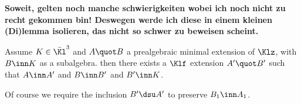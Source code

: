 

\medskip
{\bf Soweit, gelten noch manche schwierigkeiten wobei ich noch nicht zu recht gekommen bin!
Deswegen werde ich diese in einem kleinen (Di)lemma isolieren, das nicht so schwer zu beweisen
scheint.}
\begin{lem}\label{dilemma}
Assume $K\in\bar\Kl^{3}$ and $A\quot B$ a prealgebraic minimal extension of $\Klz$, with $B \inn K$
as a subalgebra. then there exists a $\Klf$ extension $A^{\prime}\quot B^{\prime}$ such that
$A\inn A^{\prime}$ and $B\inn B^{\prime}$ and $B^{\prime}\inn K$.

Of course we require the inclusion $B^{\prime}\dsu A^{\prime}$ to preserve $B_{1}\inn A_{1}$.
\end{lem}

